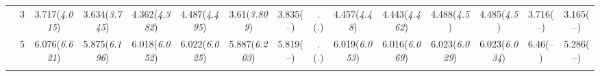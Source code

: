 \documentclass{article}
\begin{document}
\begin{table}[tbp]
{\begin{tabularx}{\textwidth}{lCCCCCCCCCCCCCC}
&3&3.717\newline (\emph{4.015})&3.634\newline (\emph{3.745})&4.362\newline (\emph{4.382})&4.487\newline (\emph{4.495})&3.61\newline (\emph{3.809})&3.835\newline (--)&.\newline (\emph{.})&4.457\newline (\emph{4.48})&4.443\newline (\emph{4.462})&4.488\newline (\emph{4.5})&4.485\newline (\emph{4.5})&3.716\newline (--)&3.165\newline (--) \tabularnewline
&5&6.076\newline (\emph{6.621})&5.875\newline (\emph{6.196})&6.018\newline (\emph{6.052})&6.022\newline (\emph{6.025})&5.887\newline (\emph{6.203})&5.819\newline (--)&.\newline (\emph{.})&6.019\newline (\emph{6.053})&6.016\newline (\emph{6.069})&6.023\newline (\emph{6.029})&6.023\newline (\emph{6.034})&6.46\newline (--)&5.286\newline (--) \tabularnewline
\bottomrule \addlinespace[1.5ex]

\end{tabularx}
}
\end{table}
\end{document}
